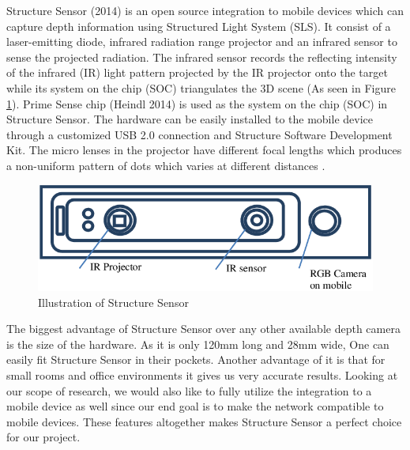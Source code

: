 Structure Sensor (2014) is an open source integration to mobile devices which can capture depth information using Structured Light System (SLS). It consist of a laser-emitting diode, infrared radiation range projector and an infrared sensor to sense the projected radiation. The infrared sensor records the reflecting intensity of the infrared (IR) light pattern projected by the IR projector onto the target while its system on the chip (SOC) triangulates the 3D scene  \cite{Kalantari} (As seen in Figure \ref{fig:Structuresensor}). Prime Sense chip (Heindl 2014) is used as the system on the chip (SOC) in Structure Sensor. The hardware can be easily installed to the mobile device through a customized USB 2.0 connection and Structure Software Development Kit. The micro lenses in the projector have different focal lengths which produces a non-uniform pattern of dots which varies at different distances \cite{Kalantari}. \\


\begin{figure}[h]
\centering
    \includegraphics[scale=0.29]{Figures/illustration-of-structure-sensor.png}
    \caption{Illustration of Structure Sensor}
    \label{fig:Structuresensor}
\end{figure}

The biggest advantage of Structure Sensor over any other available depth camera is the size of the hardware. As it is only 120mm long and 28mm wide, One can easily fit Structure Sensor in their pockets. Another advantage of it is that for small rooms and office environments it gives us very accurate results. Looking at our scope of research, we would also like to fully utilize the integration to a mobile device as well since our end goal is to make the network compatible to mobile devices. These features altogether makes Structure Sensor a perfect choice for our project.\\